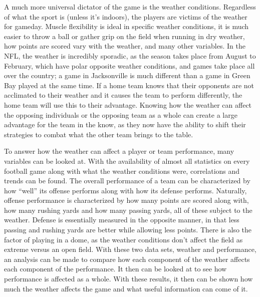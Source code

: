 \documentclass[12pt]{article}
\begin{document}
A much more universal dictator of the game is the weather conditions. Regardless of what the sport is (unless it’s indoors), the players are victims of the weather for gameday. Muscle flexibility is ideal in specific weather conditions, it is much easier to throw a ball or gather grip on the field when running in dry weather, how points are scored vary with the weather, and many other variables. In the NFL, the weather is incredibly sporadic, as the season takes place from August to February, which have polar opposite weather conditions, and games take place all over the country; a game in Jacksonville is much different than a game in Green Bay played at the same time. If a home team knows that their opponents are not acclimated to their weather and it causes the team to perform differently, the home team will use this to their advantage. Knowing how the weather can affect the opposing individuals or the opposing team as a whole can create a large advantage for the team in the know, as they now have the ability to shift their strategies to combat what the other team brings to the table.

To answer how the weather can affect a player or team performance, many variables can be looked at. With the availability of almost all statistics on every football game along with what the weather conditions were, correlations and trends can be found. The overall performance of a team can be characterized by how “well” its offense performs along with how its defense performs. Naturally, offense performance is characterized by how many points are scored along with, how many rushing yards and how many passing yards, all of these subject to the weather. Defense is essentially measured in the opposite manner, in that less passing and rushing yards are better while allowing less points. There is also the factor of playing in a dome, as the weather conditions don’t affect the field as extreme versus an open field. With these two data sets, weather and performance, an analysis can be made to compare how each component of the weather affects each component of the performance. It then can be looked at to see how performance is affected as a whole. With these results, it then can be shown how much the weather affects the game and what useful information can come of it.
\end{document}
